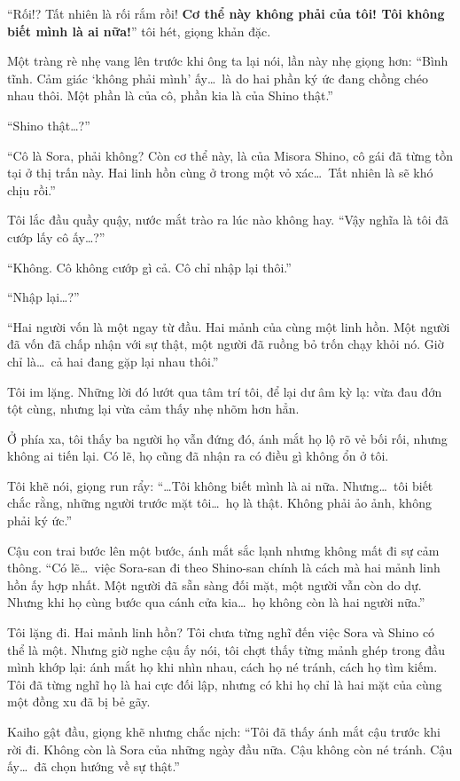 \documentclass[../main.tex]{subfiles}
\begin{document}
``Rối!? Tất nhiên là rối rắm rồi! \textbf{Cơ thể này không phải của tôi! Tôi không biết mình là ai nữa!}'' tôi hét, giọng khản đặc.

Một tràng rè nhẹ vang lên trước khi ông ta lại nói, lần này nhẹ giọng hơn: ``Bình tĩnh. Cảm giác `không phải mình' ấy\dots\ là do hai phần ký ức đang chồng chéo nhau thôi. Một phần là của cô, phần kia là của Shino thật.''

``Shino thật\dots?''

``Cô là Sora, phải không? Còn cơ thể này, là của Misora Shino, cô gái đã từng tồn tại ở thị trấn này. Hai linh hồn cùng ở trong một vỏ xác\dots\ Tất nhiên là sẽ khó chịu rồi.''

Tôi lắc đầu quầy quậy, nước mắt trào ra lúc nào không hay. ``Vậy nghĩa là tôi đã cướp lấy cô ấy\dots?''

``Không. Cô không cướp gì cả. Cô chỉ nhập lại thôi.''

``Nhập lại\dots?''

``Hai người vốn là một ngay từ đầu. Hai mảnh của cùng một linh hồn. Một người đã vốn đã chấp nhận với sự thật, một người đã ruồng bỏ trốn chạy khỏi nó. Giờ chỉ là\dots\ cả hai đang gặp lại nhau thôi.''

Tôi im lặng. Những lời đó lướt qua tâm trí tôi, để lại dư âm kỳ lạ: vừa đau đớn tột cùng, nhưng lại vừa cảm thấy nhẹ nhõm hơn hẳn.

Ở phía xa, tôi thấy ba người họ vẫn đứng đó, ánh mắt họ lộ rõ vẻ bối rối, nhưng không ai tiến lại. Có lẽ, họ cũng đã nhận ra có điều gì không ổn ở tôi.

Tôi khẽ nói, giọng run rẩy: ``\dots Tôi không biết mình là ai nữa. Nhưng\dots\ tôi biết chắc rằng, những người trước mặt tôi\dots\ họ là thật. Không phải ảo ảnh, không phải ký ức.''

Cậu con trai bước lên một bước, ánh mắt sắc lạnh nhưng không mất đi sự cảm thông. ``Có lẽ\dots\ việc Sora-san đi theo Shino-san chính là cách mà hai mảnh linh hồn ấy hợp nhất. Một người đã sẵn sàng đối mặt, một người vẫn còn do dự. Nhưng khi họ cùng bước qua cánh cửa kia\dots\ họ không còn là hai người nữa.''

Tôi lặng đi. Hai mảnh linh hồn? Tôi chưa từng nghĩ đến việc Sora và Shino có thể là một. Nhưng giờ nghe cậu ấy nói, tôi chợt thấy từng mảnh ghép trong đầu mình khớp lại: ánh mắt họ khi nhìn nhau, cách họ né tránh, cách họ tìm kiếm. Tôi đã từng nghĩ họ là hai cực đối lập, nhưng có khi họ chỉ là hai mặt của cùng một đồng xu đã bị bẻ gãy.

Kaiho gật đầu, giọng khẽ nhưng chắc nịch: ``Tôi đã thấy ánh mắt cậu trước khi rời đi. Không còn là Sora của những ngày đầu nữa. Cậu không còn né tránh. Cậu ấy\dots\ đã chọn hướng về sự thật.''
\end{document}
